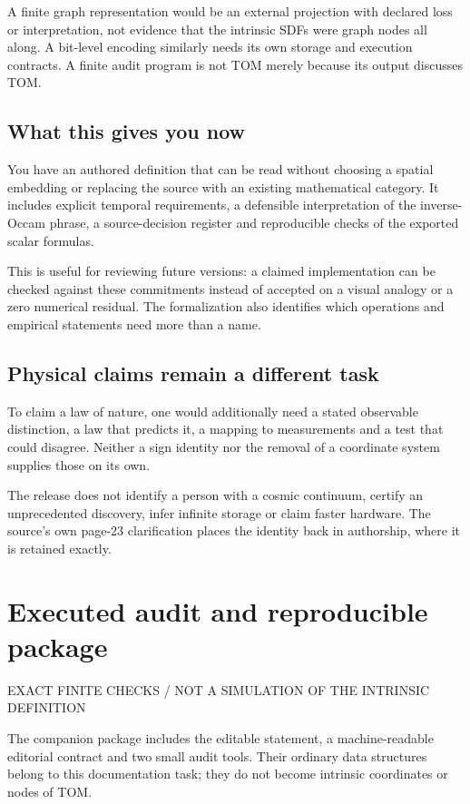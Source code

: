 \documentclass[11pt,a4paper]{article}
\newcommand{\newsec}[2]{\clearpage\section{#1}{\sffamily\footnotesize\color{teal}\MakeUppercase{#2}\par}\vspace{5pt}}
\begin{document}
A finite graph representation would be an external projection with declared loss or interpretation, not evidence that the intrinsic SDFs were graph nodes all along. A bit-level encoding similarly needs its own storage and execution contracts. A finite audit program is not TOM merely because its output discusses TOM.

\subsection{What this gives you now}
You have an authored definition that can be read without choosing a spatial embedding or replacing the source with an existing mathematical category. It includes explicit temporal requirements, a defensible interpretation of the inverse-Occam phrase, a source-decision register and reproducible checks of the exported scalar formulas.

This is useful for reviewing future versions: a claimed implementation can be checked against these commitments instead of accepted on a visual analogy or a zero numerical residual. The formalization also identifies which operations and empirical statements need more than a name.

\subsection{Physical claims remain a different task}
To claim a law of nature, one would additionally need a stated observable distinction, a law that predicts it, a mapping to measurements and a test that could disagree. Neither a sign identity nor the removal of a coordinate system supplies those on its own.

\begin{boxx}
The release does not identify a person with a cosmic continuum, certify an unprecedented discovery, infer infinite storage or claim faster hardware. The source's own page-23 clarification places the identity back in authorship, where it is retained exactly.
\end{boxx}

\newsec{Executed audit and reproducible package}{Exact finite checks / not a simulation of the intrinsic definition}
The companion package includes the editable statement, a machine-readable editorial contract and two small audit tools. Their ordinary data structures belong to this documentation task; they do not become intrinsic coordinates or nodes of TOM.
\end{document}
